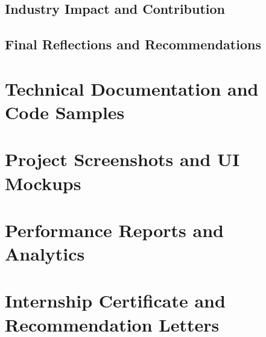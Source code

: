 \documentclass[a4paper, 11pt, oneside]{report}
\begin{document}
  \section{Industry Impact and Contribution}
  \section{Final Reflections and Recommendations}
  

\appendix
\chapter{Technical Documentation and Code Samples}
\chapter{Project Screenshots and UI Mockups}
\chapter{Performance Reports and Analytics}
\chapter{Internship Certificate and Recommendation Letters}



\end{document}
